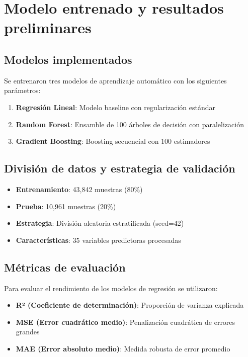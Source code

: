 
\section{Modelo entrenado y resultados preliminares}
\subsection{Modelos implementados}
Se entrenaron tres modelos de aprendizaje automático con los siguientes parámetros:

\begin{enumerate}
    \item \textbf{Regresión Lineal}: Modelo baseline con regularización estándar
    \item \textbf{Random Forest}: Ensamble de 100 árboles de decisión con paralelización
    \item \textbf{Gradient Boosting}: Boosting secuencial con 100 estimadores
\end{enumerate}

\subsection{División de datos y estrategia de validación}
\begin{itemize}
    \item \textbf{Entrenamiento}: 43,842 muestras (80\%)
    \item \textbf{Prueba}: 10,961 muestras (20\%)
    \item \textbf{Estrategia}: División aleatoria estratificada (seed=42)
    \item \textbf{Características}: 35 variables predictoras procesadas
\end{itemize}

\subsection{Métricas de evaluación}
Para evaluar el rendimiento de los modelos de regresión se utilizaron:

\begin{itemize}
    \item \textbf{R² (Coeficiente de determinación)}: Proporción de varianza explicada
    \item \textbf{MSE (Error cuadrático medio)}: Penalización cuadrática de errores grandes
    \item \textbf{MAE (Error absoluto medio)}: Medida robusta de error promedio
\end{itemize}

